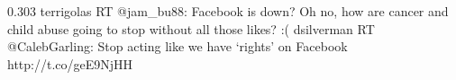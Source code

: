 %
%
%
%
%
%
%
%
%
{0.303}
{\joinNameTweet
{terrigolas}
{RT @jam\_bu88: Facebook is down? Oh no, how are cancer and child abuse going to stop without all those likes? :(}}
{\joinNameTweet
{dsilverman}
{RT @CalebGarling: Stop acting like we have ‘rights' on Facebook http://t.co/geE9NjHH}}
%
